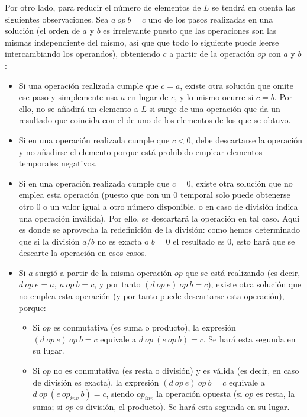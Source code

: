 \documentclass{article}
\begin{document}
Por otro lado, para reducir el número de elementos de $L$ se tendrá en cuenta las siguientes observaciones. Sea $a\ op\ b = c$ uno de los pasos realizadas en una solución (el orden de $a$ y $b$ es irrelevante puesto que las operaciones son las mismas independiente del mismo, así que que todo lo siguiente puede leerse intercambiando los operandos), obteniendo $c$ a partir de la operación $op$ con $a$ y $b$:

\begin{itemize}
	\item Si una operación realizada cumple que $c=a$, existe otra solución que omite ese paso y simplemente usa $a$ en lugar de $c$, y lo mismo ocurre si $c=b$. Por ello, no se añadirá un elemento a $L$ si surge de una operación que da un resultado que coincida con el de uno de los elementos de los que se obtuvo.
	\item Si en una operación realizada cumple que $c < 0$, debe descartarse la operación y no añadirse el elemento porque está prohibido emplear elementos temporales negativos.
	\item Si en una operación realizada cumple que $c = 0$, existe otra solución que no emplea esta operación (puesto que con un $0$ temporal solo puede obtenerse otro $0$ o un valor igual a otro número disponible, o en caso de división indica una operación inválida). Por ello, se descartará la operación en tal caso. Aquí es donde se aprovecha la redefinición de la división: como hemos determinado que si la división $a/b$ no es exacta o $b=0$ el resultado es $0$, esto hará que se descarte la operación en esos casos.
	\item Si $a$ surgió a partir de la misma operación $op$ que se está realizando (es decir, $d\ op\ e = a,\ a\ op\ b = c$, y por tanto $(d\ op\ e)\ op\ b = c$), existe otra solución que no emplea esta operación (y por tanto puede descartarse esta operación), porque:
	\begin{itemize}
		\item Si $op$ es conmutativa (es suma o producto), la expresión $(d\ op\ e)\ op\ b = c$ equivale a $d\ op\ (e\ op\ b) = c$. Se hará esta segunda en su lugar.
		\item Si $op$ no es conmutativa (es resta o división) y es válida (es decir, en caso de división es exacta), la expresión $(d\ op\ e)\ op\ b = c$ equivale a $d\ op\ (e\ op_{inv}\ b) = c$, siendo $op_{inv}$ la operación opuesta (si $op$ es resta, la suma; si $op$ es división, el producto). Se hará esta segunda en su lugar.
	\end{itemize}

\end{itemize}
\end{document}
